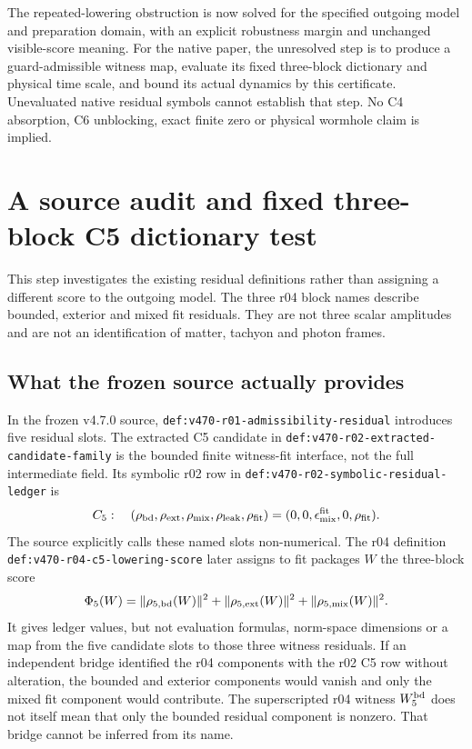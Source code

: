 \documentclass[11pt,a4paper]{article}
\begin{document}
The repeated-lowering obstruction is now solved for the specified
outgoing model and preparation domain, with an explicit robustness
margin and unchanged visible-score meaning. For the native paper,
the unresolved step is to produce a guard-admissible witness map,
evaluate its fixed three-block dictionary and physical time scale,
and bound its actual dynamics by this certificate. Unevaluated
native residual symbols cannot establish that step. No C4
absorption, C6 unblocking, exact finite zero or physical wormhole
claim is implied.

\section{A source audit and fixed three-block C5 dictionary test}
\label{sec:fixed-native-c5-dictionary-audit}

This step investigates the existing residual definitions rather
than assigning a different score to the outgoing model. The
three r04 block names describe bounded, exterior and mixed fit
residuals. They are not three scalar amplitudes and are not an
identification of matter, tachyon and photon frames.

\subsection{What the frozen source actually provides}

In the frozen v4.7.0 source, \texttt{def:v470-r01-admissibility-residual}
introduces five residual slots. The extracted C5 candidate in
\texttt{def:v470-r02-extracted-candidate-family} is the bounded
finite witness-fit interface, not the full intermediate field.
Its symbolic r02 row in
\texttt{def:v470-r02-symbolic-residual-ledger} is
\[
 C_5:\quad
 (\rho_{\rm bd},\rho_{\rm ext},\rho_{\rm mix},
   \rho_{\rm leak},\rho_{\rm fit})
 =(0,0,\epsilon^{\rm fit}_{\rm mix},0,\rho_{\rm fit}).
\]
The source explicitly calls these named slots non-numerical.
The r04 definition
\texttt{def:v470-r04-c5-lowering-score} later assigns to fit
packages $W$ the three-block score
\[
 \Phi_5(W)=\|\rho_{5,\rm bd}(W)\|^2
          +\|\rho_{5,\rm ext}(W)\|^2
          +\|\rho_{5,\rm mix}(W)\|^2.
\]
It gives ledger values, but not evaluation formulas, norm-space
dimensions or a map from the five candidate slots to those three
witness residuals. If an independent bridge identified the r04
components with the r02 C5 row without alteration, the bounded
and exterior components would vanish and only the mixed fit
component would contribute. The superscripted r04 witness
$W_5^{\rm bd}$ does not itself mean that only the bounded residual
component is nonzero. That bridge cannot be inferred from its name.
\end{document}
